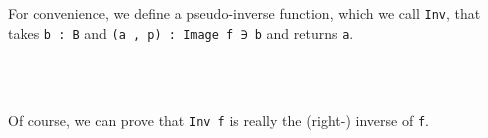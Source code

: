 For convenience, we define a pseudo-inverse function, which we call \texttt{Inv}, that takes \texttt{b\ :\ B} and \texttt{(a\ ,\ p)\ :\ Image\ f\ ∋\ b} and returns \texttt{a}.
\ccpad
\begin{code}%
\>[0][@{}l@{\AgdaIndent{1}}]%
\>[1]\AgdaSpace{}%
\AgdaSymbol{:}\AgdaSpace{}%
\AgdaSymbol{\{}\AgdaSpace{}%
\AgdaSymbol{:}\AgdaSpace{}%
\AgdaSpace{}%
\AgdaSpace{}%
\AgdaSymbol{\}\{}\AgdaSpace{}%
\AgdaSymbol{:}\AgdaSpace{}%
\AgdaSpace{}%
\AgdaSpace{}%
\AgdaSymbol{\}(}\AgdaSpace{}%
\AgdaSymbol{:}\AgdaSpace{}%
\AgdaSpace{}%
\AgdaSpace{}%
\AgdaSymbol{)(}\AgdaSpace{}%
\AgdaSymbol{:}\AgdaSpace{}%
\AgdaSymbol{)}\AgdaSpace{}%
\AgdaSpace{}%
\AgdaSpace{}%
\AgdaSpace{}%
\AgdaSpace{}%
%
\>[61]%
\>[64]\<%
\\
%
\>[1]\AgdaSpace{}%
\AgdaSpace{}%
\AgdaSpace{}%
\AgdaDottedPattern{\AgdaSymbol{)}}\AgdaSpace{}%
\AgdaSymbol{(}\AgdaSpace{}%
\AgdaSymbol{)}\AgdaSpace{}%
\AgdaSymbol{=}\AgdaSpace{}%
\<%
\\
%
\>[1]\AgdaSpace{}%
\AgdaSpace{}%
\AgdaSpace{}%
\AgdaSymbol{(}\AgdaSpace{}%
\AgdaSpace{}%
\AgdaSpace{}%
\AgdaSymbol{)}\AgdaSpace{}%
\AgdaSymbol{=}\AgdaSpace{}%
\<%
\end{code}
\ccpad
Of course, we can prove that \texttt{Inv\ f} is really the (right-) inverse of \texttt{f}.

